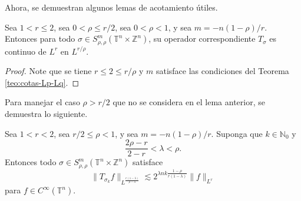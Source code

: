 Ahora, se demuestran algunos lemas de acotamiento útiles.
\begin{lemma}
	Sea $1 < r \leq 2$, sea $0<\rho\leq r/2$, sea $0<\rho<1$, y sea $m = -n(1-\rho)/r$. Entonces para todo $\sigma \in S^m_{\rho,\rho}(\mathbb{T}^n \times \mathbb{Z}^n) $, su operador correspondiente $T_\sigma$ es continuo de $L^r$ en $L^{r/\rho}$.
	\label{lem:Lr-Lr/rho-boundedness}
\end{lemma}
\begin{proof}
	Note que se tiene $r\leq 2 \leq r/\rho$ y $m$ satisface las condiciones del Teorema \ref{teo:cotas-Lp-Lq}.
\end{proof}
Para manejar el caso $\rho > r/2$ que no se considera en el lema anterior, se demuestra lo siguiente.
\begin{lemma}
	Sea $1<r<2$, sea $r/2\leq\rho<1$, y sea $m=-n(1-\rho)/r$. Suponga que $k\in\mathbb{N}_0$ y 
	\begin{equation*}
		\frac{2\rho-r}{2-r} < \lambda < \rho.
	\end{equation*}
	Entonces todo $\sigma \in S^m_{\rho,\rho}(\mathbb{T}^n \times \mathbb{Z}^n) $ satisface 
	\begin{equation*}
		\|T_{\sigma_k}f\|_{L^{\frac{r(1-\lambda)}{\rho-\lambda}} } \lesssim 2^{\lambda nk \frac{1-\rho}{r(1-\lambda)}} \|f\|_{L^r}
	\end{equation*}
	para $f\in C^\infty(\mathbb{T}^n)$.
	\label{lem:Lr-lambda-boundedness}
\end{lemma}

